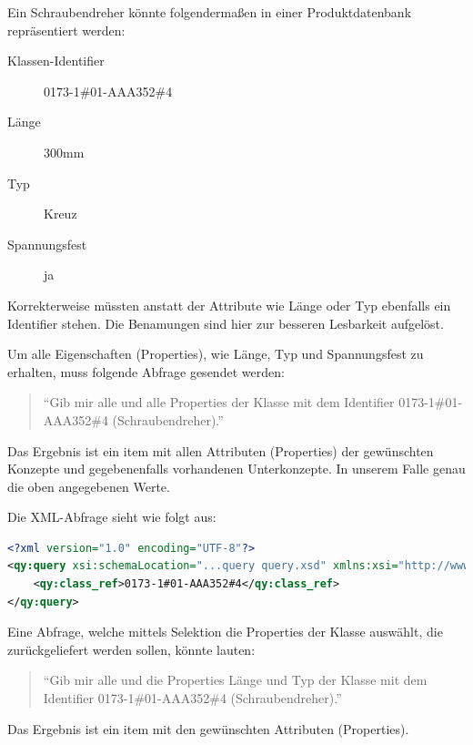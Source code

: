Ein Schraubendreher könnte folgendermaßen in einer Produktdatenbank repräsentiert werden:

\begin{description}
\item[Klassen-Identifier] 0173-1\#01-AAA352\#4 
\item[Länge] 300mm
\item[Typ] Kreuz
\item[Spannungsfest] ja
\end{description}

Korrekterweise müssten anstatt der Attribute wie Länge oder Typ ebenfalls ein Identifier stehen. Die Benamungen sind hier zur besseren Lesbarkeit aufgelöst. 

Um alle Eigenschaften (Properties), wie Länge, Typ und Spannungsfest zu erhalten, muss folgende Abfrage gesendet werden: 
\begin{quotation}
\enquote{Gib mir alle  und alle Properties der Klasse mit dem Identifier 0173-1\#01-AAA352\#4 (Schraubendreher).}
\end{quotation}

Das Ergebnis ist ein \gls{item} mit allen Attributen (Properties) der gewünschten Konzepte und gegebenenfalls vorhandenen Unterkonzepte. In unserem Falle genau die oben angegebenen Werte.

Die XML-Abfrage sieht wie folgt aus:

\begin{lstlisting}[caption=Query Beispiel - Daten abfragen, language=XML, label=UseCaseDatenabfragen]
<?xml version="1.0" encoding="UTF-8"?>
<qy:query xsi:schemaLocation="...query query.xsd" xmlns:xsi="http://www.w3.org/2001/XMLSchema-instance" xmlns:cat="...catalogue" xmlns:val="...value" xmlns:qy="...query" xmlns:bas="...basic">
	<qy:class_ref>0173-1#01-AAA352#4</qy:class_ref>
</qy:query>
\end{lstlisting}

Eine Abfrage, welche mittels Selektion die Properties der Klasse auswählt, die zurückgeliefert werden sollen, könnte lauten: 
\begin{quotation}
\enquote{Gib mir alle  und die Properties Länge und Typ der Klasse mit dem Identifier 0173-1\#01-AAA352\#4 (Schraubendreher).}
\end{quotation}

Das Ergebnis ist ein \gls{item} mit den gewünschten Attributen (Properties). 


